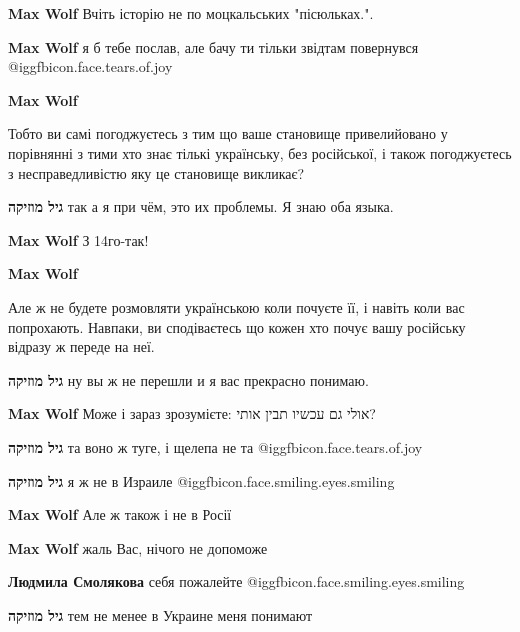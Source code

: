 \begin{itemize}
\begin{itemize}
\textbf{Max Wolf} Вчіть історію не по моцкальських "пісюльках.".

\textbf{Max Wolf} я б тебе послав, але бачу ти тільки звідтам повернувся @igg{fbicon.face.tears.of.joy} 

\textbf{Max Wolf}

Тобто ви самі погоджуєтесь з тим що ваше становище привелийовано у порівнянні з
тими хто знає тількі українську, без російської, і також погоджуєтесь з
несправедливістю яку це становище викликає?

\textbf{גיל מוזיקה} так а я при чём, это их проблемы. Я знаю оба языка.

\textbf{Max Wolf} З 14го-так!

\textbf{Max Wolf}

Але ж не будете розмовляти українською коли почуєте її, і навіть коли вас
попрохають. Навпаки, ви сподіваєтесь що кожен хто почує вашу російську відразу
ж переде на неї.


\textbf{גיל מוזיקה} ну вы ж не перешли и я вас прекрасно понимаю.

\textbf{Max Wolf}
Може і зараз зрозумієте:
אולי גם עכשיו תבין אותי?

\textbf{גיל מוזיקה} та воно ж туге, і щелепа не та @igg{fbicon.face.tears.of.joy} 

\textbf{גיל מוזיקה} я ж не в Израиле @igg{fbicon.face.smiling.eyes.smiling} 

\textbf{Max Wolf}
Але ж також і не в Росії

\textbf{Max Wolf} жаль Вас, нічого не допоможе

\textbf{Людмила Смолякова} себя пожалейте @igg{fbicon.face.smiling.eyes.smiling} 

\textbf{גיל מוזיקה} тем не менее в Украине меня понимают

\end{itemize} %


\end{itemize} %
